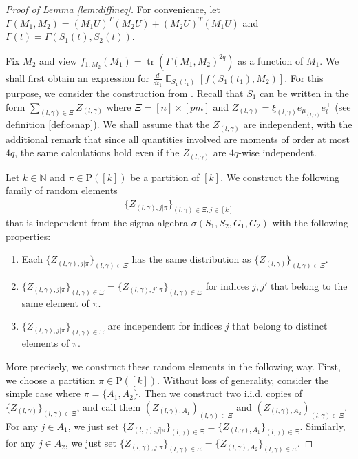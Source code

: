 \documentclass[11pt]{amsart}
\numberwithin{equation}{section}
\numberwithin{equation}{section}
\DeclareMathOperator{\E}{\mathbb{E}}
\DeclareMathOperator*{\tr}{tr}
\theoremstyle{remark}
\theoremstyle{definition}
\begin{document}
\begin{proof}[Proof of Lemma \ref{lem:diffineq}]


For convenience, let $\Gamma(M_1,M_2)=(M_1U)^T(M_2U)+(M_2U)^T(M_1U)$ and $\Gamma(t)=\Gamma(S_1(t),S_2(t))$.

Fix $M_2$ and view $f_{1,M_2}(M_1)=\tr(\Gamma(M_1,M_2)^{2q})$ as a function of $M_1$. We shall first obtain an expression for $\frac{d}{dt_1}\E_{S_1(t_1)}[f(S_1(t_1),M_2)]$. For this purpose, we consider the construction from \cite{brailovskaya2022universality}. Recall that $S_1$ can be written in the form $\sum_{(l,\gamma) \in \Xi} Z_{(l,\gamma)}$ where $\Xi=[n] \times [pm]$ and $Z_{(l,\gamma)}=\xi_{(l,\gamma)} e_{\mu_{(l, \gamma)}} e_l ^\top$ (see definition \ref{def:osnap}). We shall assume that the $Z_{(l,\gamma)}$ are independent, with the additional remark that since all quantities involved are moments of order at most $4q$, the same calculations hold even if the $Z_{(l,\gamma)}$ are $4q$-wise independent.

Let $k\in\mathbb{N}$ and $\pi\in\mathrm{P}([k])$ be a partition of $[k]$. We construct the following family of random elements
\begin{align*}
\{Z_{(l,\gamma),j|\pi}\}_{(l,\gamma)\in \Xi, j \in [k]}
\end{align*}
that is independent from the sigma-algebra $\sigma(S_1,S_2,G_1,G_2)$ 
with the
following properties:
\begin{enumerate}[1.]
\item Each $\{Z_{(l,\gamma),j|\pi}\}_{(l,\gamma)\in \Xi}$ has the same distribution as
$\{Z_{(l,\gamma)}\}_{(l,\gamma) \in \Xi}$.
\item $\{Z_{(l,\gamma),j|\pi}\}_{(l,\gamma)\in \Xi}=\{Z_{(l,\gamma),j'|\pi}\}_{(l,\gamma)\in \Xi}$ for indices $j,j'$
that belong to
the same element of $\pi$.
\item $\{Z_{(l,\gamma),j|\pi}\}_{(l,\gamma)\in \Xi}$ are independent for indices $j$ that belong
to distinct elements of $\pi$.
\end{enumerate}
More precisely, we construct these random elements in the following way. First, we choose a partition $\pi\in\mathrm{P}([k])$. Without loss of generality, consider the simple case where $\pi=\{A_1,A_2\}$. Then we construct two i.i.d. copies of $\{Z_{(l,\gamma)}\}_{(l,\gamma) \in \Xi}$, and call them $(Z_{(l,\gamma),A_1})_{(l,\gamma) \in \Xi}$ and $(Z_{(l,\gamma),A_2})_{(l,\gamma) \in \Xi}$. For any $j \in A_1$, we just set $\{Z_{(l,\gamma),j|\pi}\}_{(l,\gamma)\in \Xi}=\{Z_{(l,\gamma),A_1}\}_{(l,\gamma) \in \Xi}$. Similarly, for any $j \in A_2$, we just set $\{Z_{(l,\gamma),j|\pi}\}_{(l,\gamma)\in \Xi}=\{Z_{(l,\gamma),A_2}\}_{(l,\gamma) \in \Xi}$.


\end{proof}
\end{document}
